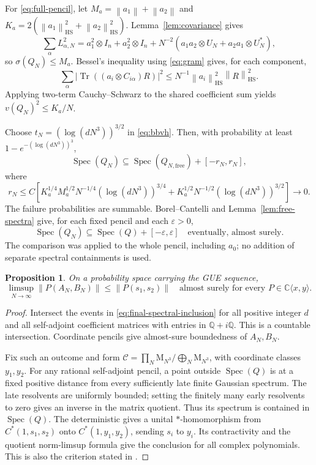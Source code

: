 \documentclass[11pt]{article}
\newtheorem{proposition}[theorem]{Proposition}
\DeclareMathOperator{\Tr}{Tr}
\DeclareMathOperator{\Spec}{Spec}
\newcommand{\C}{\mathbb C}
\newcommand{\M}{\mathrm M}
\newcommand{\HS}{\mathrm{HS}}
\newcommand{\norm}[1]{\left\|#1\right\|}
\begin{document}
For \eqref{eq:full-pencil}, let
$M_a=\norm{a_1}+\norm{a_2}$ and
$K_a=2(\norm{a_1}_{\HS}^2+\norm{a_2}_{\HS}^2)$.
Lemma~\ref{lem:covariance} gives
\[
 \sum_\alpha L_{\alpha,N}^2
 =a_1^2\otimes I_n+a_2^2\otimes I_n+
 N^{-2}(a_1a_2\otimes U_N+a_2a_1\otimes U_N^*),
\]
so $\sigma(Q_N)\le M_a$.
Bessel's inequality using \eqref{eq:gram} gives, for each component,
\[
 \sum_\alpha|\Tr((a_i\otimes C_{i\alpha})R)|^2
 \le N^{-1}\norm{a_i}_{\HS}^2\norm{R}_{\HS}^2.
\]
Applying two-term Cauchy--Schwarz to the shared coefficient sum yields
$v(Q_N)^2\le K_a/N$.

Choose $t_N=(\log(dN^3))^{3/2}$ in \eqref{eq:bbvh}.
Then, with probability at least $1-e^{-(\log(dN^3))^3}$,
\begin{equation}\label{eq:gaussian-free-inclusion}
 \Spec(Q_N)\subseteq\Spec(Q_{N,\mathrm{free}})+[-r_N,r_N],
\end{equation}
where
\[
 r_N\le C\left[
 K_a^{1/4}M_a^{1/2}N^{-1/4}(\log(dN^3))^{3/4}
 +K_a^{1/2}N^{-1/2}(\log(dN^3))^{3/2}\right]\longrightarrow0.
\]
The failure probabilities are summable.
Borel--Cantelli and Lemma~\ref{lem:free-spectra} give, for each fixed
pencil and each $\varepsilon>0$,
\begin{equation}\label{eq:final-spectral-inclusion}
 \Spec(Q_N)\subseteq\Spec(Q)+[-\varepsilon,\varepsilon]
 \quad\text{eventually, almost surely}.
\end{equation}
The comparison was applied to the whole pencil, including $a_0$;
no addition of separate spectral containments is used.

\begin{proposition}\label{prop:upper}
On a probability space carrying the GUE sequence,
\[
 \limsup_{N\to\infty}\norm{P(A_N,B_N)}
       \le\norm{P(s_1,s_2)}
 \quad\text{almost surely for every }P\in\C\langle x,y\rangle.
\]
\end{proposition}

\begin{proof}
Intersect the events in \eqref{eq:final-spectral-inclusion} for all
positive integer $d$ and all self-adjoint coefficient matrices with
entries in $\mathbb Q+i\mathbb Q$. This is a countable intersection.
Coordinate pencils give almost-sure boundedness of $A_N,B_N$.

Fix such an outcome and form
$\mathcal C=\prod_N\M_{N^3}/\bigoplus_N\M_{N^3}$,
with coordinate classes $y_1,y_2$.
For any rational self-adjoint pencil, a point outside $\Spec(Q)$ is
at a fixed positive distance from every sufficiently late finite
Gaussian spectrum. The late resolvents are uniformly bounded; setting
the finitely many early resolvents to zero gives an inverse in the
matrix quotient. Thus its spectrum is contained in $\Spec(Q)$.
The deterministic \cite[Theorem~2.4]{HT} gives a unital
$*$-homomorphism from $C^*(1,s_1,s_2)$ onto $C^*(1,y_1,y_2)$,
sending $s_i$ to $y_i$.
Its contractivity and the quotient norm-limsup formula give the
conclusion for all complex polynomials.
This is also the criterion stated in \cite[Theorem~7.7]{BBvH}.
\end{proof}
\end{document}

